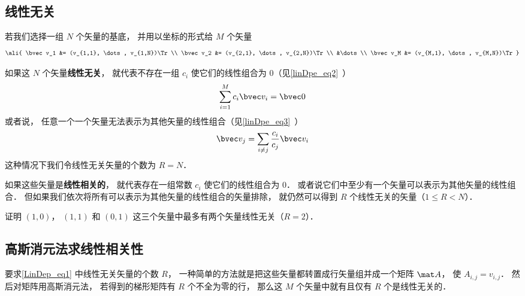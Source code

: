 

\subsection{线性无关}

若我们选择一组 $N$ 个矢量的基底， 并用以坐标的形式给 $M$ 个矢量
\begin{equation}\label{LinDep_eq1}
\ali{
\bvec v_1 &= (v_{1,1}, \dots, v_{1,N})\Tr \\
\bvec v_2 &= (v_{2,1}, \dots, v_{2,N})\Tr \\
&\dots \\
\bvec v_M &= (v_{M,1}, \dots, v_{M,N})\Tr
}\end{equation}

如果这 $N$ 个矢量\textbf{线性无关}， 就代表不存在一组 $c_i$ 使它们的线性组合为 0（见\autoref{linDpe_eq2}~）
\begin{equation}
\sum_{i=1}^M c_i\bvec v_i = \bvec 0
\end{equation}
或者说， 任意一个一个矢量无法表示为其他矢量的线性组合（见\autoref{linDpe_eq3}~）%
\begin{equation}
\bvec v_j = \sum_{i \ne j}\frac{c_i}{c_j} \bvec v_i
\end{equation}
这种情况下我们令线性无关矢量的个数为 $R = N$．

如果这些矢量是\textbf{线性相关的}， 就代表存在一组常数 $c_i$ 使它们的线性组合为 0． 或者说它们中至少有一个矢量可以表示为其他矢量的线性组合． 但如果我们依次将所有可以表示为其他矢量的线性组合的矢量排除， 就仍然可以得到  $R$ 个线性无关的矢量（$1 \leqslant R < N$）．

\begin{exercise}{}
证明 $(1,0)$， $(1,1)$ 和 $(0,1)$ 这三个矢量中最多有两个矢量线性无关（$R = 2$）．
\end{exercise}

\subsection{高斯消元法求线性相关性}
要求\autoref{LinDep_eq1} 中线性无关矢量的个数 $R$， 一种简单的方法就是把这些矢量都转置成行矢量组并成一个矩阵 $\mat A$， 使 $A_{i,j} = v_{i,j}$． 然后对矩阵用高斯消元法， 若得到的梯形矩阵有 $R$ 个不全为零的行， 那么这 $M$ 个矢量中就有且仅有 $R$ 个是线性无关的．





 